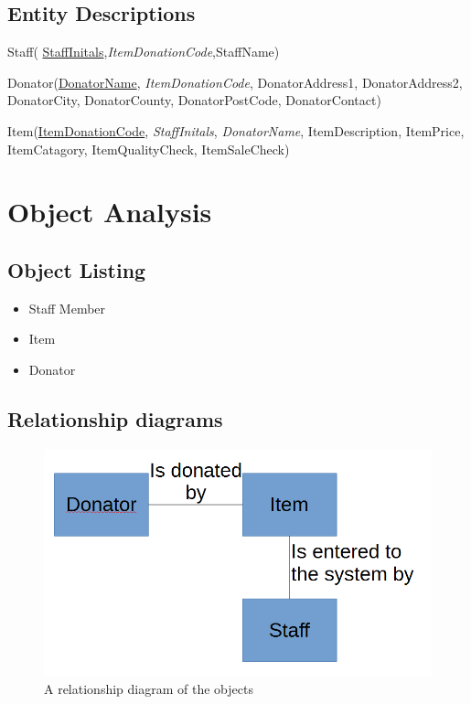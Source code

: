 \subsection{Entity Descriptions}
Staff( \underline{StaffInitals},\textit{ItemDonationCode},StaffName)

Donator(\underline{DonatorName}, \textit{ItemDonationCode}, DonatorAddress1, DonatorAddress2, DonatorCity, DonatorCounty, DonatorPostCode, DonatorContact)

Item(\underline{ItemDonationCode}, \textit{StaffInitals}, \textit{DonatorName}, ItemDescription, ItemPrice, ItemCatagory, ItemQualityCheck, ItemSaleCheck)

\section{Object Analysis}

\subsection{Object Listing}
\begin{itemize}
    \item Staff Member
    \item Item
    \item Donator
\end{itemize}

\subsection{Relationship diagrams}
\begin{figure}[H]
    \includegraphics[width=\textwidth]{RelationshipDiagram.png}
    \caption{A relationship diagram of the objects} \label{fig:Relationship Diagram}
\end{figure}
